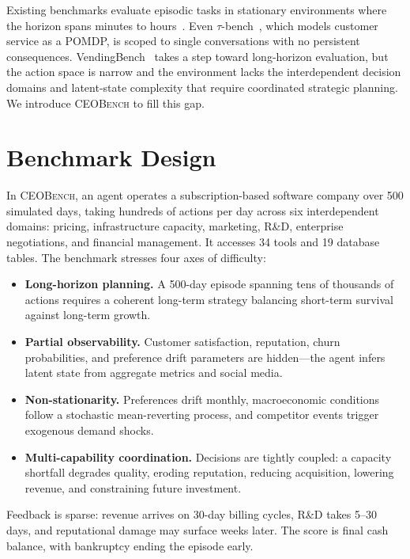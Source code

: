 \documentclass[10pt,letterpaper,twocolumn]{article}
\begin{document}
Existing benchmarks evaluate episodic tasks in stationary environments where the horizon spans minutes to hours~\cite{jimenez2024swebench,zhou2024webarena,liu2023agentbench,mialon2024gaia}. Even $\tau$-bench~\cite{yao2024taubench}, which models customer service as a POMDP, is scoped to single conversations with no persistent consequences. VendingBench~\cite{backlund2025vendingbench} takes a step toward long-horizon evaluation, but the action space is narrow and the environment lacks the interdependent decision domains and latent-state complexity that require coordinated strategic planning. We introduce \textsc{CEOBench} to fill this gap.

\section{Benchmark Design}

In \textsc{CEOBench}, an agent operates a subscription-based software company over 500 simulated days, taking hundreds of actions per day across six interdependent domains: pricing, infrastructure capacity, marketing, R\&D, enterprise negotiations, and financial management. It accesses 34 tools and 19 database tables. The benchmark stresses four axes of difficulty:
\begin{itemize}
  \item \textbf{Long-horizon planning.} A 500-day episode spanning tens of thousands of actions requires a coherent long-term strategy balancing short-term survival against long-term growth.
  \item \textbf{Partial observability.} Customer satisfaction, reputation, churn probabilities, and preference drift parameters are hidden---the agent infers latent state from aggregate metrics and social media.
  \item \textbf{Non-stationarity.} Preferences drift monthly, macroeconomic conditions follow a stochastic mean-reverting process, and competitor events trigger exogenous demand shocks.
  \item \textbf{Multi-capability coordination.} Decisions are tightly coupled: a capacity shortfall degrades quality, eroding reputation, reducing acquisition, lowering revenue, and constraining future investment.
\end{itemize}

\vspace{-3pt}
Feedback is sparse: revenue arrives on 30-day billing cycles, R\&D takes 5--30 days, and reputational damage may surface weeks later. The score is final cash balance, with bankruptcy ending the episode early.
\end{document}
